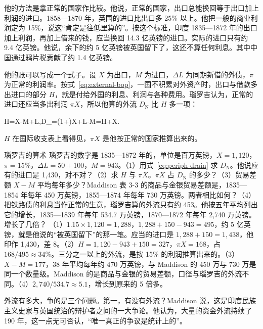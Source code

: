 他的方法是拿正常的国家作比较。他说，正常的国家，出口总能换回等于出口加上利润的进口\cite{naoroji1901}。1858—1870 年，英国的进口比出口多 25\% 以上\cite{naoroji1901}。他把一般的商业利润定为 15\%，说这“肯定是往低里算的”\cite{naoroji1901}。按这个标准，印度 1835—1872 年的出口加上利润，再加上借来的钱，应当换回 14.3 亿英镑的进口\cite{naoroji1901}。实际的进口只有约 9.4 亿英镑\cite{naoroji1901}。他说，余下的约 5 亿英镑被英国留下了，这还不算任何利息\cite{naoroji1901}。其中中国通过鸦片税贡献了约 1.4 亿英镑\cite{naoroji1901}。

他的账可以写成一个式子。设 $X$ 为出口，$M$ 为进口，$\Delta L$ 为同期新借的外债，$\pi$ 为正常的利润率。按式~\eqref{eq:external-bop}，一国不积累对外资产时，出口与借款多出进口的部分 $H$，就是付给外国的利息、利润与各种费用。瑙罗吉认为，正常的进口还应当多出利润 $\pi X$，所以他算的外流 $D_{\text{N}}$ 比 $H$ 多一项：
\begin{keyeq}
H=X-M+\Delta L,\qquad D_{}=(1+\pi)X+\Delta L-M=H+\pi X.\label{eq:periph-drain}
\end{keyeq}
$H$ 在国际收支表上看得见，$\pi X$ 是他按正常的国家推算出来的。

\begin{example}{瑙罗吉的算术}\label{ex:periph-naoroji}
瑙罗吉的数字是 1835—1872 年的，单位是百万英镑，$X=1{,}120$，$\pi=15\%$，$\Delta L=50+100$，$M=943$\cite{naoroji1901}。（1）用式~\eqref{eq:periph-drain} 求 $D_{\text{N}}$。他说应有的进口是 1,430，对不对？（2）求 $H$ 与 $\pi X$。$\pi X$ 占 $D_{\text{N}}$ 的多少？（3）贸易差额 $X-M$ 平均每年多少？Maddison 表 3-3 的商品与金银贸易差额是，1835—1854 年每年 450 万英镑，1855—1874 年每年 730 万英镑\cite{maddison1971}。两者相比如何？（4）把铁路债的利息当作正常的生意，瑙罗吉算的外流只有约 453\cite{naoroji1901}。他按五年平均列出它的增长，1835—1839 年每年 534.7 万英镑，1870—1872 年每年 2,740 万英镑\cite{naoroji1901}。增长了几倍？
\solution （1）$1.15\times1{,}120=1{,}288$，$1{,}288+150-943=495$，约 5 亿英镑，就是他说的“被英国留下”的那一笔。应当的进口是 $1{,}288+150=1{,}438$，他印作 1,430，差 8。（2）$H=1{,}120-943+150=327$，$\pi X=168$，占 $168/495\approx34\%$。三分之一以上的外流，是按 15\% 的利润推算出来的。（3）$X-M=177$，38 年平均每年约 470 万英镑，与 Maddison 的 450 万与 730 万是同一个数量级。Maddison 的是商品与金银的贸易差额，口径与瑙罗吉的外流不同。（4）$2{,}740/534.7\approx5.1$，增长到原来的 5 倍多。
\end{example}

外流有多大，争的是三个问题。第一，有没有外流？Maddison 说，这是印度民族主义史家与英国统治的辩护者之间的一大争论\cite{maddison1971}。他认为，大量的资金外流持续了 190 年，这一点无可否认，“唯一真正的争议是统计上的”\cite{maddison1971}。

